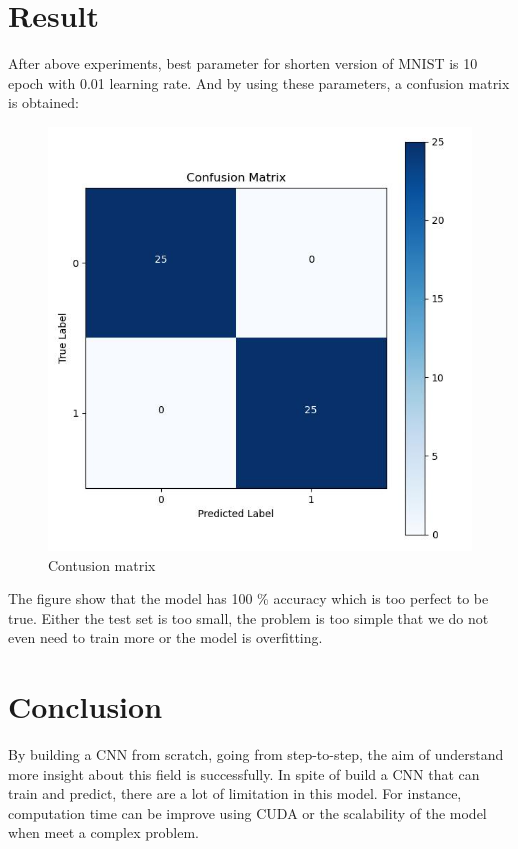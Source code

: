 \documentclass[journal]{IEEEtran} %
\begin{document}
\newpage
\section{Result}
After above experiments, best parameter for shorten version of MNIST is 10 epoch with 0.01 learning rate. And by using these parameters, a confusion matrix is obtained:
\begin{figure}[h!]
    \centering
    \includegraphics[width=1\linewidth]{Confusion.png}
    \caption{Contusion matrix}
\end{figure}

The figure show that the model has 100 \% accuracy which is too perfect to be true. Either the test set is too small, the problem is too simple that we do not even need to train more or the model is overfitting.

\section{Conclusion}
By building a CNN from scratch, going from step-to-step, the aim of understand more insight about this field is successfully. In spite of build a CNN that can train and predict, there are a lot of limitation in this model. For instance, computation time can be improve using CUDA or the scalability of the model when meet a complex problem.


\end{document}
